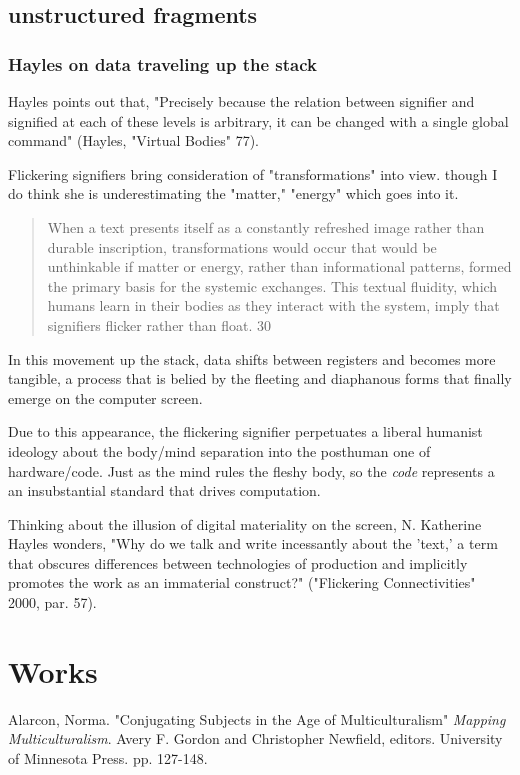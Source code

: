 \documentclass[11pt]{article}
\begin{document}
\subsection{unstructured fragments}
\label{sec:orgdbc57cf}
\subsubsection{Hayles on data traveling up the stack}
\label{sec:org11d2102}
Hayles points out that, "Precisely because the relation between
signifier and signified at each of these levels is arbitrary, it can
be changed with a single global command" (Hayles, "Virtual Bodies"
77).

Flickering signifiers bring consideration of "transformations" into
view. though I do think she is underestimating the "matter," "energy"
which goes into it. 
\begin{quote}
When a text presents itself as a constantly refreshed image rather
than durable inscription, transformations would occur that would be
unthinkable if matter or energy, rather than informational patterns,
formed the primary basis for the systemic exchanges. This textual
fluidity, which humans learn in their bodies as they interact with the
system, imply that signifiers flicker rather than float. 30
\end{quote}

In this movement up the stack, data shifts
between registers and becomes more tangible, a process that is belied
by the fleeting and diaphanous forms that finally emerge on the
computer screen.

Due to this appearance, the flickering signifier perpetuates a liberal
humanist ideology about the body/mind separation into the posthuman
one of hardware/code. Just as the mind rules the fleshy body, so the
\emph{code} represents a an insubstantial standard that drives computation.

Thinking about the illusion of digital materiality on the screen,
N. Katherine Hayles wonders, "Why do we talk and write incessantly
about the 'text,' a term that obscures differences between
technologies of production and implicitly promotes the work as an
immaterial construct?" ("Flickering Connectivities" 2000,
par. 57). 




\section{Works}
\label{sec:orge7d3258}
Alarcon, Norma. "Conjugating Subjects in the Age of Multiculturalism"
\emph{Mapping Multiculturalism}. Avery F. Gordon and Christopher Newfield,
editors. University of Minnesota Press. pp. 127-148.
\end{document}
